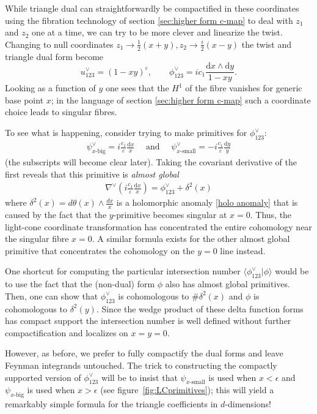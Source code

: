 \documentclass[11pt]{article}
\renewcommand{\d}{\text{d}}
\newcommand{\be}{\begin{equation}}
\newcommand{\ee}{\end{equation}}
\newcommand{\la}{\langle}
\newcommand{\ra}{\rangle}
\newcommand{\xbig}{{x\text{-big}}}
\newcommand{\xsmall}{{x\text{-small}}}
\newcommand{\vep}{\varepsilon}
\begin{document}
While triangle dual can straightforwardly be compactified in these coordinates using the fibration technology of section \ref{sec:higher form c-map}
to deal with $z_1$ and $z_2$ one at a time, we can try to be more clever and linearize the twist.
Changing to null coordinates $z_1 \to \frac{1}{2} (x+y), z_2 \to \frac{i}{2} (x-y)$ the twist and triangle dual form become
\be
	u^\vee_{123} = (1 - xy)^\vep,
	\qquad
	\phi^\vee_{123} = ic_1 \frac{\d x \wedge \d y}{1 - x y}. 
\ee
Looking as a function of $y$ one sees that the $H^1$ of the fibre vanishes for generic base point $x$;
in the language of section \ref{sec:higher form c-map} such a coordinate choice leads to singular fibres.

To see what is happening, consider trying to make primitives for $\phi^\vee_{123}$:
\begin{align} \label{eq:almost global primitives}
	\psi_{\xbig}^\vee = i \frac{c_1}{\vep} \frac{\d x}{x}
	\quad\text{ and }\quad
	\psi_\xsmall^\vee = -i \frac{c_1}{\vep} \frac{\d y}{y}
\end{align}
(the subscripts will become clear later). Taking the covariant derivative of the first reveals that this primitive is \emph{almost global}
\begin{align}
	\nabla^\vee \left( i\frac{c_1}{\vep} \frac{\d x}{x} \right)
	= \phi^\vee_{123} + \delta^2(x)
\end{align}
where $\delta^2(x)=d\theta(x)\wedge \frac{dx}{x}$ is a holomorphic anomaly \eqref{holo anomaly} that is caused by the fact that the $y$-primitive
becomes singular at $x=0$.  Thus, the light-cone coordinate transformation has concentrated the entire cohomology near the singular fibre $x=0$. 
A similar formula exists for the other almost global primitive that concentrates the cohomology on the $y=0$ line instead. 


One shortcut for computing the particular intersection number $\la \phi^\vee_{123} | \phi \ra$ would be to use the fact that the (non-dual) form $\phi$
also has almost global primitives.
Then, one can show that $\phi^\vee_{123}$ is cohomologous to $\# \delta^2(x)$ and $\phi$ is cohomologous to $\delta^2(y)$. Since the wedge product of these delta function forms has compact support the intersection number is well defined without further compactification and localizes on $x=y=0$. 

However, as before, we prefer to fully compactify the dual forms and leave Feynman integrands untouched.
The trick to constructing the compactly supported version of $\phi^\vee_{123}$ will be to insist that $\psi_\xsmall$ is used when $x<\epsilon$ and $\psi_\xbig$ is used when $x>\epsilon$ (see figure~\ref{fig:LCprimitives}); this will yield a remarkably simple formula for the triangle coefficients in $d$-dimensions!
\end{document}
